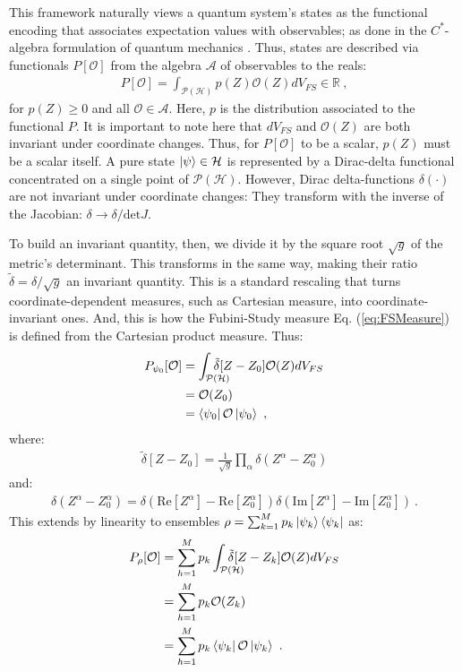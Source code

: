 \documentclass[draft,nofootinbib,pre,twocolumn,showpacs,showkeys,groupaddress,preprintnumbers,floatfix]{revtex4-1}
\newcommand{\1}{\mathbbm{1}}
\newcommand{\intP}{\int_{\mathcal{P}(\mathcal{H})} \!\!\!\!\!\!\!\!\!}
\begin{document}
This framework naturally views a quantum system's states as the functional
encoding that associates expectation values with observables; as done in the
$C^{*}$-algebra formulation of quantum mechanics \cite{Strocchi2008a}. Thus,
states are described via functionals $P[\mathcal{O}]$ from the algebra
$\mathcal{A}$ of observables to the reals: 
\begin{align*}
P[\mathcal{O}] = \int_{\mathcal{P}(\mathcal{H})}
  p(Z) \mathcal{O}(Z) dV_{FS} \in \mathbb{R}
  ~,
\end{align*}
for $p(Z) \geq 0$ and all $\mathcal{O} \in \mathcal{A}$. Here, $p$ is the
distribution associated to the functional $P$. It is important to note here
that $dV_{FS}$ and $\mathcal{O}(Z)$ are both invariant under coordinate
changes. Thus, for $P[\mathcal{O}]$ to be a scalar, $p(Z)$ must be a scalar
itself. A pure state $\ket{\psi} \in \mathcal{H}$ is represented by a
Dirac-delta functional concentrated on a single point of
$\mathcal{P}(\mathcal{H})$. However, Dirac delta-functions $\delta(\cdot)$ are
not invariant under coordinate changes: They transform with the inverse of the
Jacobian: $\delta \to \delta / \mathrm{det} J $.

To build an invariant quantity, then, we divide it by the square root
$\sqrt{g}$ of the metric's determinant. This transforms in the same way,
making their ratio $\tilde{\delta} = \delta/\sqrt{g}$ an invariant quantity.
This is a standard rescaling that turns coordinate-dependent measures, such as
Cartesian measure, into coordinate-invariant ones. And, this is how the
Fubini-Study measure Eq. (\ref{eq:FSMeasure}) is defined from the Cartesian
product measure. Thus:
\begin{align}
P_{\psi_0}[\mathcal{O}]
  & = \intP \tilde{\delta} [Z-Z_0] \nonumber
  \mathcal{O}(Z) dV_{FS}
  \label{eq:GQM_PureState} \\
  & = \mathcal{O}(Z_0) \nonumber \\
  & = \bra{\psi_0}\mathcal{O} \ket{\psi_0}
  ~,
\end{align}
where:
\begin{align*}
\tilde{\delta}[Z-Z_0]
  = \frac{1}{\sqrt{g}} \prod_{\alpha} \delta(Z^\alpha - Z_0^\alpha)
\end{align*}
and:
\begin{align*}
\delta(Z^\alpha - Z_0^\alpha)
  = \delta(\mathrm{Re}[Z^\alpha]
  - \mathrm{Re}[Z^\alpha_0])\delta(\mathrm{Im}[Z^\alpha]
  - \mathrm{Im}[Z^\alpha_0])
  ~.
\end{align*}
This extends by linearity to ensembles $\rho =
\sum_{k=1}^M p_k \ket{\psi_k} \bra{\psi_k}$ as:
\begin{align*}
P_\rho[\mathcal{O}] 
  & = \sum_{h=1}^M p_k  \intP \tilde{\delta} [Z-Z_k] \mathcal{O}(Z) dV_{FS} \\
  & = \sum_{h=1}^M p_k \mathcal{O}(Z_k) \\
  & = \sum_{h=1}^M p_k\bra{\psi_k}\mathcal{O}\ket{\psi_k} 
  ~.
\end{align*}
\end{document}
